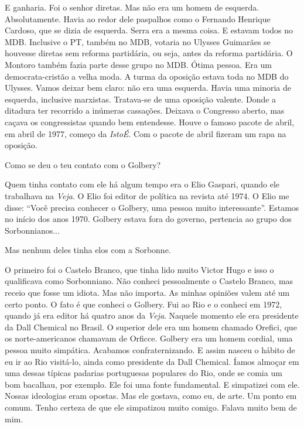  E ganharia. Foi o senhor diretas. Mas não era um homem de esquerda.
Absolutamente. Havia ao redor dele paspalhos como o Fernando Henrique
Cardoso, que se dizia de esquerda. Serra era a mesma coisa. E estavam
todos no MDB. Inclusive o PT, também no MDB, votaria no Ulysses
Guimarães se houvesse diretas sem reforma partidária, ou seja, antes da
reforma partidária. O Montoro também fazia parte desse grupo no MDB.
Ótima pessoa. Era um democrata-cristão a velha moda. A turma da oposição
estava toda no MDB do Ulysses. Vamos deixar bem claro: não era uma
esquerda. Havia uma minoria de esquerda, inclusive marxistas. Tratava-se
de uma oposição valente. Donde a ditadura ter recorrido a inúmeras
cassações. Deixava o Congresso aberto, mas caçava os congressistas
quando bem entendesse. Houve o famoso pacote de abril, em abril de 1977,
começo da \emph{IstoÉ}. Com o pacote de abril fizeram um rapa na
oposição.

 Como se deu o teu contato com o Golbery?

 Quem tinha contato com ele há algum tempo era o Elio Gaspari, quando
ele trabalhava na \emph{Veja}. O Elio foi editor de política na revista
até 1974. O Elio me disse: ``Você precisa conhecer o Golbery, uma pessoa
muito interessante''. Estamos no início dos anos 1970. Golbery estava
fora do governo, pertencia ao grupo dos Sorbonnianos...

 Mas nenhum deles tinha elos com a Sorbonne.

 O primeiro foi o Castelo Branco, que tinha lido muito Victor Hugo e
isso o qualificava como Sorbonniano. Não conheci pessoalmente o Castelo
Branco, mas receio que fosse um idiota. Mas não importa. As minhas
opiniões valem até um certo ponto. O fato é que conheci o Golbery. Fui
ao Rio e o conheci em 1972, quando já era editor há quatro anos da
\emph{Veja}. Naquele momento ele era presidente da Dall Chemical no
Brasil. O superior dele era um homem chamado Orefici, que os
norte-americanos chamavam de Orficce. Golbery era um homem cordial, uma
pessoa muito simpática. Acabamos confraternizando. E assim nasceu o
hábito de eu ir ao Rio visitá-lo, ainda como presidente da Dall
Chemical. Íamos almoçar em uma dessas típicas padarias portuguesas
populares do Rio, onde se comia um bom bacalhau, por exemplo. Ele foi
uma fonte fundamental. E simpatizei com ele. Nossas ideologias eram
opostas. Mas ele gostava, como eu, de arte. Um ponto em comum. Tenho
certeza de que ele simpatizou muito comigo. Falava muito bem de mim.

